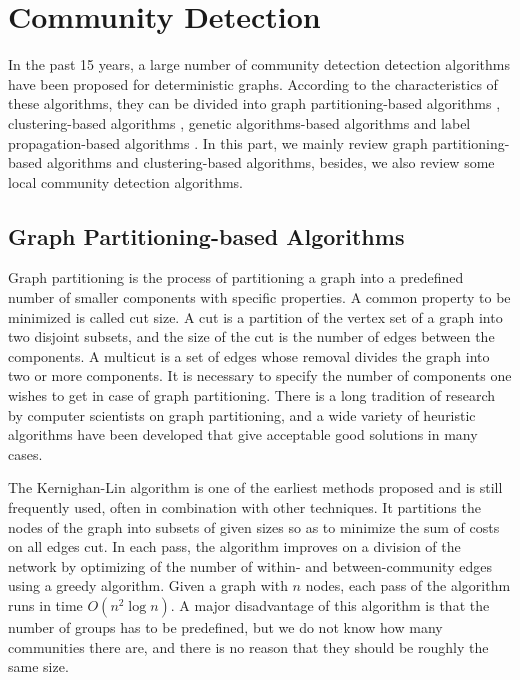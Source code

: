 \documentclass[\main/thesis.tex]{subfiles}
\begin{document}
\section{Community Detection}
In the past 15 years, a large number of community detection detection algorithms have been proposed for deterministic graphs. According to the characteristics of these algorithms, they can be divided into graph partitioning-based algorithms \cite{kernighan1970efficient,newman2013community}, clustering-based algorithms \cite{girvan2002community,newman2004fast,blondel2008fast,clauset2004finding}, genetic algorithms-based algorithms \cite{pizzuti2008ga} and label propagation-based algorithms \cite{raghavan2007near}. In this part, we mainly review graph partitioning-based algorithms and clustering-based algorithms, besides, we also review some local community detection algorithms.

\subsection{Graph Partitioning-based Algorithms}
Graph partitioning is the process of partitioning a graph into a predefined number of smaller components with specific properties. A common property to be minimized is called cut size. A cut is a partition of the vertex set of a graph into two disjoint subsets, and the size of the cut is the number of edges between the components. A multicut is a set of edges whose removal divides the graph into two or more components. It is necessary to specify the number of components one wishes to get in case of graph partitioning. There is a long tradition of research by computer scientists on graph partitioning, and a wide variety of heuristic algorithms have been developed that give acceptable good solutions in many cases.

The Kernighan-Lin \cite{kernighan1970efficient} algorithm is one of the earliest methods proposed and is still frequently used, often in combination with other techniques. It partitions the nodes of the graph into subsets of given sizes so as to minimize the sum of costs on all edges cut. In each pass, the algorithm improves on a division of the network by optimizing of the number of within- and between-community edges using a greedy algorithm. Given a graph with $n$ nodes, each pass of the algorithm runs in time $O(n^2 \log n)$. A major disadvantage of this algorithm is that the number of groups has to be predefined, but we do not know how many communities there are, and there is no reason that they should be roughly the same size.
\end{document}
